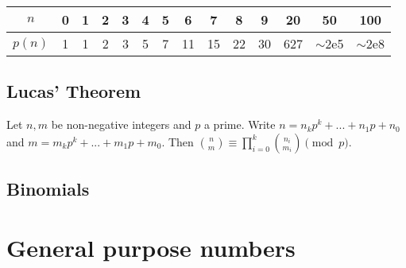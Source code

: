 		\begin{center}
		\begin{tabular}{c|c@{\ }c@{\ }c@{\ }c@{\ }c@{\ }c@{\ }c@{\ }c@{\ }c@{\ }c@{\ }c@{\ }c@{\ }c}
			$n$    & 0 & 1 & 2 & 3 & 4 & 5 & 6  & 7  & 8  & 9  & 20  & 50  & 100 \\ \hline
			$p(n)$ & 1 & 1 & 2 & 3 & 5 & 7 & 11 & 15 & 22 & 30 & 627 & $\mathtt{\sim}$2e5 & $\mathtt{\sim}$2e8 \\
		\end{tabular}
		\end{center}

	\subsection{Lucas' Theorem}
		Let $n,m$ be non-negative integers and $p$ a prime. Write $n=n_kp^k+...+n_1p+n_0$ and $m=m_kp^k+...+m_1p+m_0$. Then $\binom{n}{m} \equiv \prod_{i=0}^k\binom{n_i}{m_i} \pmod{p}$.

	\subsection{Binomials}

\section{General purpose numbers}




